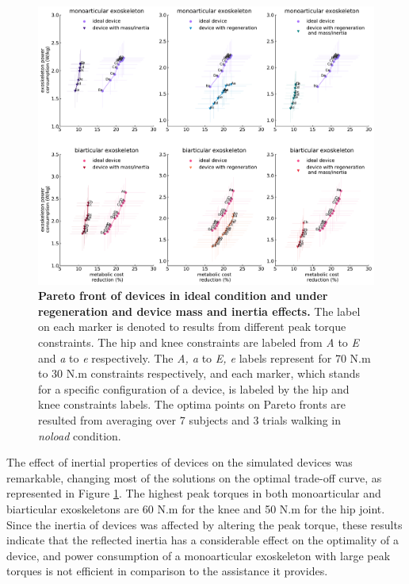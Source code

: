 \documentclass[10pt,letterpaper]{article}
\begin{document}
\begin{figure}[ht]   
	\centering
	\includegraphics[width=\linewidth]{Pareto_Mass_Regenration_Figures/PaperFigure_Pareto_Comparison.pdf}
	\vspace{1mm}
	\caption{{\small\textbf{Pareto front of devices in ideal condition and under regeneration and device mass and inertia effects.} The label on each marker is denoted to results from different peak torque constraints. The hip and knee constraints are labeled from {\it A} to {\it E} and {\it a} to {\it e} respectively. The {\it A, a} to {\it E, e} labels represent for 70 N.m to 30 N.m constraints respectively, and each marker, which stands for a specific configuration of a device, is labeled by the hip and knee constraints labels. The optima points on Pareto fronts are resulted from averaging over 7 subjects and 3 trials walking in {\it noload} condition.}}
	\label{Fig_Paretofronts_Mass_Regeneration_Effect_Comparison}
\end{figure}
\vspace{2mm}
The effect of inertial properties of devices on the simulated devices was remarkable, changing most of the solutions on the optimal trade-off curve, as represented in Figure \ref{Fig_Paretofronts_Mass_Regeneration_Effect_Comparison}. The highest peak torques in both monoarticular and biarticular exoskeletons are 60 N.m for the knee and 50 N.m for the hip joint. Since the inertia of devices was affected by altering the peak torque, these results indicate that the reflected inertia has a considerable effect on the optimality of a device, and power consumption of a monoarticular exoskeleton with large peak torques is not efficient in comparison to the assistance it provides.\\ 
\end{document}
